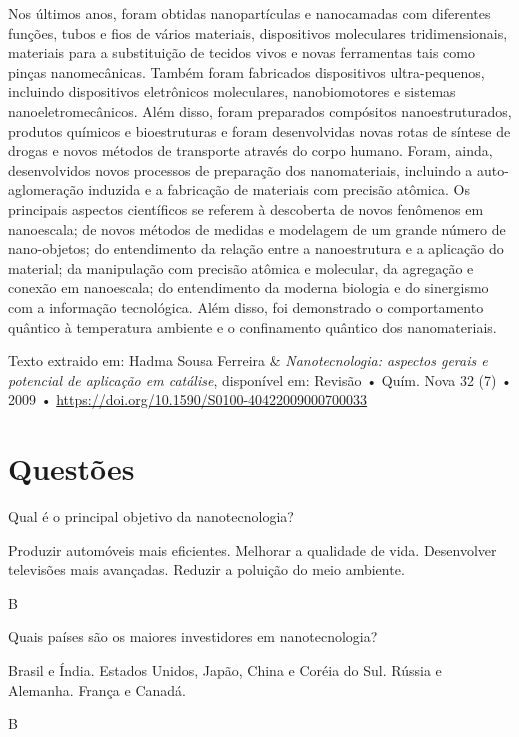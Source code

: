 \documentclass[10pt]{scrartcl}
\begin{document}
Nos últimos anos, foram obtidas nanopartículas e nanocamadas com diferentes funções, tubos e fios de vários materiais, dispositivos moleculares tridimensionais, materiais para a substituição de tecidos vivos e novas ferramentas tais como pinças nanomecânicas. Também foram fabricados dispositivos ultra-pequenos, incluindo dispositivos eletrônicos moleculares, nanobiomotores e sistemas nanoeletromecânicos. Além disso, foram preparados compósitos nanoestruturados, produtos químicos e bioestruturas e foram desenvolvidas novas rotas de síntese de drogas e novos métodos de transporte através do corpo humano. Foram, ainda, desenvolvidos novos processos de preparação dos nanomateriais, incluindo a auto-aglomeração induzida e a fabricação de materiais com precisão atômica. Os principais aspectos científicos se referem à descoberta de novos fenômenos em nanoescala; de novos métodos de medidas e modelagem de um grande número de nano-objetos; do entendimento da relação entre a nanoestrutura e a aplicação do material; da manipulação com precisão atômica e molecular, da agregação e conexão em nanoescala; do entendimento da moderna biologia e do sinergismo com a informação tecnológica. Além disso, foi demonstrado o comportamento quântico à temperatura ambiente e o confinamento quântico dos nanomateriais.


Texto extraido em: Hadma Sousa Ferreira \& \emph{Nanotecnologia: aspectos gerais e potencial de aplicação em catálise}, disponível em: Revisão • Quím. Nova 32 (7) • 2009 • \url{https://doi.org/10.1590/S0100-40422009000700033} 


\section{Questões}
\label{sec:orgc6af5eb}


\begin{exercise}[points=1]
Qual é o principal objetivo da nanotecnologia?
\begin{choice}
\choice Produzir automóveis mais eficientes.
\choice Melhorar a qualidade de vida.
\choice Desenvolver televisões mais avançadas.
\choice Reduzir a poluição do meio ambiente.
\end{choice}
\end{exercise}
\begin{solution}
B
\end{solution}

\begin{exercise}[points=1]
Quais países são os maiores investidores em nanotecnologia?

\begin{choice}
\choice Brasil e Índia.
\choice Estados Unidos, Japão, China e Coréia do Sul.
\choice Rússia e Alemanha.
\choice França e Canadá.
\end{choice}
\end{exercise}
\begin{solution}
B
\end{solution}
\end{document}
